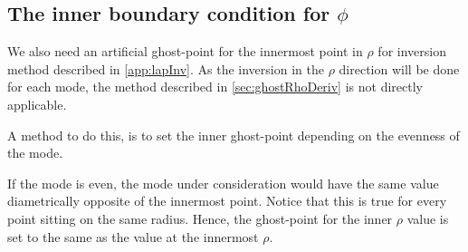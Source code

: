 \subsection{The inner boundary condition for \texorpdfstring{$\phi$}{the potential}}
\label{sec:innerPhiBC}
%
We also need an artificial ghost-point for the innermost point in $\rho$ for inversion method described in \cref{app:lapInv}.
As the inversion in the $\rho$ direction will be done for each mode, the method described in \cref{sec:ghostRhoDeriv} is not directly applicable.

A method to do this, is to set the inner ghost-point depending on the evenness of the mode.

If the mode is even, the mode under consideration would have the same value diametrically opposite of the innermost point.
Notice that this is true for every point sitting on the same radius.
Hence, the ghost-point for the inner $\rho$ value is set to the same as the value at the innermost $\rho$.

